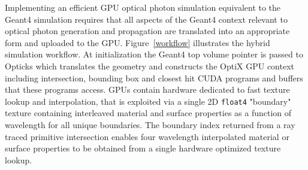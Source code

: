 \documentclass{webofc}
\begin{document}
Implementing an efficient GPU optical photon simulation equivalent to the Geant4 simulation 
requires that all aspects of the Geant4 context relevant to optical photon generation and 
propagation are translated into an appropriate form and uploaded to the GPU. 
%
Figure~\ref{workflow} illustrates the hybrid simulation workflow. 
At initialization the Geant4 top volume pointer is
passed to Opticks which translates the geometry and constructs 
the OptiX GPU context including intersection, bounding box 
and closest hit CUDA programs and buffers that these programs access.
GPUs contain hardware dedicated to fast texture lookup and interpolation, that 
is exploited via a single 2D {\tt float4} "boundary" texture containing interleaved material 
and surface properties as a function of wavelength for all unique boundaries.
The boundary index returned from a ray traced primitive intersection
enables four wavelength interpolated material or surface properties to be
obtained from a single hardware optimized texture lookup.
\end{document}
